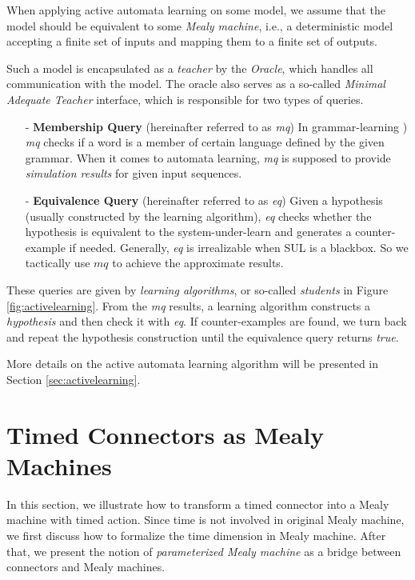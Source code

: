 \documentclass[conference, a4paper]{IEEEtran}
\begin{document}
When applying active automata learning on some model, we assume that the model should be equivalent
to some \emph{Mealy machine}, i.e., a deterministic model accepting a finite set of inputs and
mapping them to a finite set of outputs.

Such a model is encapsulated as a \emph{teacher} by the \emph{Oracle}, which handles
all communication with the model. The oracle also serves as a so-called \emph{Minimal Adequate Teacher}
interface, which is responsible for two types of queries. 

\begin{itemize}
  \item[-] \textbf{Membership Query} (hereinafter referred to as \emph{mq}) In grammar-learning
    \cite{DBLP:journals/iandc/Angluin87}) \emph{mq} checks if a word is a member of certain language
    defined by the given grammar. When it comes to
    automata learning, \emph{mq} is supposed to provide \emph{simulation results} for given input
    sequences.
  \item[-] \textbf{Equivalence Query} (hereinafter referred to as \emph{eq}) Given a hypothesis
    (usually constructed by the learning algorithm), \emph{eq} checks whether the hypothesis is
    equivalent to the system-under-learn and generates a counter-example if needed. Generally, 
    \emph{eq} is irrealizable when SUL is a blackbox. So we tactically use $mq$ to achieve the
    approximate results.
\end{itemize}

These queries are given by \emph{learning algorithms}, or so-called \emph{students} in Figure
\ref{fig:activelearning}. From the \emph{mq} results, a learning algorithm constructs a
\emph{hypothesis} and then check it with \emph{eq}. If counter-examples are found, we turn back and
repeat the hypothesis construction until the equivalence query returns \emph{true}.

More details on the active automata learning algorithm will be presented in Section
\ref{sec:activelearning}. 

\section{Timed Connectors as Mealy Machines}
\label{sec:semantics}
In this section, we illustrate how to transform a timed connector into a Mealy machine with timed
action.
Since time is not involved in original Mealy machine, we first discuss how to formalize the time
dimension in Mealy machine. After that, we present the notion of \emph{parameterized Mealy
machine} as a bridge between connectors and Mealy machines.
\end{document}
